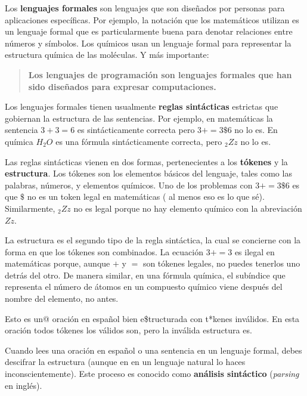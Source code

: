 Los {\bf lenguajes formales} son lenguajes que son diseñados por personas
para aplicaciones específicas. Por ejemplo, la notación que los matemáticos 
utilizan es un lenguaje formal que es particularmente buena para denotar relaciones
entre números y símbolos. Los químicos usan un lenguaje formal para representar
la estructura química de las moléculas. Y más importante:

\begin{quote}
{\bf Los lenguajes de programación son lenguajes formales que han sido diseñados
para expresar computaciones.}
\end{quote}

Los lenguajes formales tienen usualmente {\bf reglas sintácticas} estrictas
que gobiernan la estructura de las sentencias. Por ejemplo, en matemáticas la
sentencia $3 + 3 = 6$ es sintácticamente correcta pero $3 + = 3 \$ 6$ no lo es.
En química  $H_2O$ es una fórmula sintácticamente correcta, pero $_2Zz$ no lo es.

Las reglas sintácticas vienen en dos formas, pertenecientes a los {\bf tókenes} 
y la {\bf estructura}. Los tókenes son los elementos básicos del lenguaje, 
tales como las palabras, números, y elementos químicos. Uno de los problemas
con $3 += 3 \$ 6$ es que \( \$ \) no es un token legal en matemáticas (
al menos eso es lo que sé).  Similarmente, $_2Zz$ no es legal porque
no hay elemento químico con la abreviación $Zz$.

La estructura es el segundo tipo de la regla sintáctica, la cual
se concierne con la forma en que los tókenes son combinados. La ecuación
$3 += 3$  es ilegal en matemáticas porque, aunque $+$ y $=$ son 
tókenes legales, no puedes tenerlos uno detrás del otro. De manera similar,
en una fórmula química, el subíndice que representa el número de átomos en un
compuesto químico viene después del nombre del elemento, no antes.

Esto es un@ oración en español bien e\$tructurada con t*kenes
inválidos. En esta oración todos tókenes los válidos son, pero la
inválida estructura es.

Cuando lees una oración en español o una sentencia en un lenguaje
formal, debes descifrar la estructura (aunque en en un lenguaje natural
lo haces inconscientemente). Este proceso es conocido como {\bf análisis 
sintáctico} ({\em parsing} en inglés).

